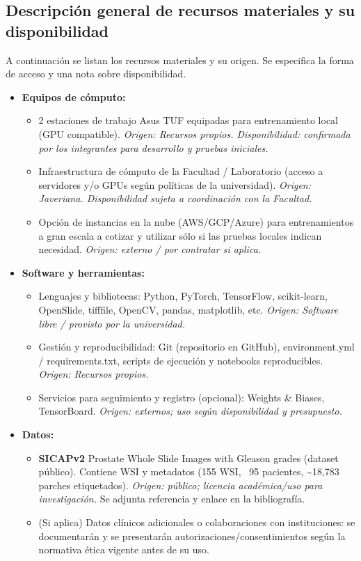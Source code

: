 \subsection{Descripción general de recursos materiales y su disponibilidad}
A continuación se listan los recursos materiales y su origen. Se especifica la forma de acceso y una nota sobre disponibilidad.

\begin{itemize}
    \item \textbf{Equipos de cómputo:}
    \begin{itemize}
        \item 2 estaciones de trabajo Asus TUF equipadas para entrenamiento local (GPU compatible). \textit{Origen: Recursos propios. Disponibilidad: confirmada por los integrantes para desarrollo y pruebas iniciales.}
        \item Infraestructura de cómputo de la Facultad / Laboratorio (acceso a servidores y/o GPUs según políticas de la universidad). \textit{Origen: Javeriana. Disponibilidad sujeta a coordinación con la Facultad.}
        \item Opción de instancias en la nube (AWS/GCP/Azure) para entrenamientos a gran escala a cotizar y utilizar sólo si las pruebas locales indican necesidad. \textit{Origen: externo / por contratar si aplica.}
    \end{itemize}

    \item \textbf{Software y herramientas:}
    \begin{itemize}
        \item Lenguajes y bibliotecas: Python, PyTorch, TensorFlow, scikit-learn, OpenSlide, tifffile, OpenCV, pandas, matplotlib, etc. \textit{Origen: Software libre / provisto por la universidad.}
        \item Gestión y reproducibilidad: Git (repositorio en GitHub), environment.yml / requirements.txt, scripts de ejecución y notebooks reproducibles. \textit{Origen: Recursos propios.}
        \item Servicios para seguimiento y registro (opcional): Weights \& Biases, TensorBoard. \textit{Origen: externos; uso según disponibilidad y presupuesto.}
    \end{itemize}

    \item \textbf{Datos:}
    \begin{itemize}
        \item \textbf{SICAPv2} Prostate Whole Slide Images with Gleason grades (dataset público). Contiene WSI y metadatos (155 WSI, ~95 pacientes, \textasciitilde18,783 parches etiquetados). \textit{Origen: público; licencia académica/uso para investigación.} Se adjunta referencia y enlace en la bibliografía.
        \item (Si aplica) Datos clínicos adicionales o colaboraciones con instituciones: se documentarán y se presentarán autorizaciones/consentimientos según la normativa ética vigente antes de su uso.
    \end{itemize}


\end{itemize}
